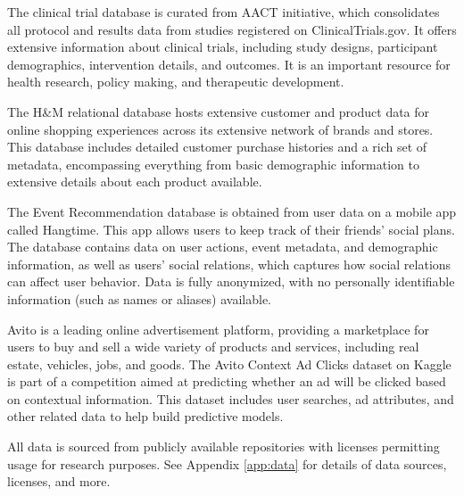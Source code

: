 \xhdr{\trials} The clinical trial database is curated from AACT initiative, which consolidates all protocol and results data from studies registered on ClinicalTrials.gov. It offers extensive information about clinical trials, including study designs, participant demographics, intervention details, and outcomes. It is an important resource for health research, policy making, and therapeutic development.

\xhdr{\handm} The H\&M relational database hosts extensive customer and product data for online shopping experiences across its extensive network of brands and stores.  This database includes detailed customer purchase histories and a rich set of metadata, encompassing everything from basic demographic information to extensive details about each product available. 

\xhdr{\event} The Event Recommendation database is obtained from user data on a mobile app called Hangtime. This app allows users to keep track of their friends' social plans. The database contains data on user actions, event metadata, and demographic information, as well as users' social relations, which captures how social relations can affect user behavior. Data is fully anonymized, with no personally identifiable information (such as names or aliases) available.

\xhdr{\avito} Avito is a leading online advertisement platform, providing a marketplace for users to buy and sell a wide variety of products and services, including real estate, vehicles, jobs, and goods. The Avito Context Ad Clicks dataset on Kaggle is part of a competition aimed at predicting whether an ad will be clicked based on contextual information. This dataset includes user searches, ad attributes, and other related data to help build predictive models.


 All data is sourced from publicly available repositories with licenses permitting usage for research purposes. See Appendix \ref{app:data} for details of data sources, licenses, and more.  


